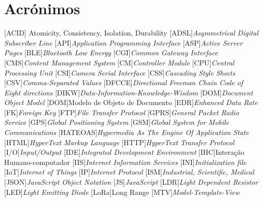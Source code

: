 
\chapter*{Acrónimos}

\begin{multicols}{2}
	
\begin{acronym}[RELAX NG]
	

[ACID]{ Atomicity, Consistency, Isolation, Durability}
[ADSL]{\textit{Asymmetrical Digital Subscriber Line}}
[API]{\textit{Application Programming Interface}}
[ASP]{\textit{Active Server Pages}}
[BLE]{\textit{Bluetooth Low Energy}}
[CGI]{\textit{Common Gateway Interface}}
[CMS]{\textit{Content Management System}}
[CM]{\textit{Controller Module}}
[CPU]{\textit{Central Processing Unit}}
[CSI]{\textit{Camera Serial Interface}}
[CSS]{\textit{Cascading Style Sheets}}
[CSV]{\textit{Comma-Separated Values}}
[DFCCE]{\textit{Directional Freeman Chain Code of Eight directions}}
[DIKW]{\textit{Data-Information-Knowledge-Wisdom}}
[DOM]{\textit{Document Object Model}}
[DOM]{Modelo de Objeto de Documento}
[EDR]{\textit{Enhanced Data Rate}}
[FK]{\textit{Foreign Key}}
[FTP]{\textit{File Transfer Protocol}}
[GPRS]{\textit{General Packet Radio Service}}
[GPS]{\textit{Global Positioning System}}
[GSM]{\textit{Global System for Mobile Communications}}
[HATEOAS]{\textit{Hypermedia As The Engine Of Application State}}
[HTML]{\textit{HyperText Markup Language}}
[HTTP]{\textit{HyperText Transfer Protocol}}
[I/O]{\textit{Input/Output}}
[IDE]{\textit{Integrated Development Environment}}
[IHC]{Interação Humano-computador}
[IIS]{\textit{Internet Information Services}}
[INI]{\textit{Initialization file}}
[IoT]{\textit{Internet of Things}}
[IP]{\textit{Internet Protocol}}
[ISM]{\textit{Industrial, Scientific, Medical}}
[JSON]{\textit{JavaScript Object Notation}}
[JS]{\textit{JavaScript}}
[LDR]{\textit{Light Dependent Resistor}}
[LED]{\textit{Light Emitting Diode}}
[LoRa]{Long Range}
[MTV]{\textit{Model-Template-View}}

\end{acronym}
\end{multicols}
